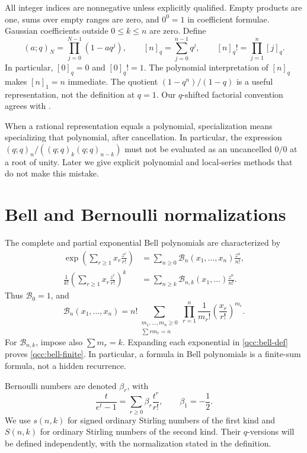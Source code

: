\documentclass[11pt,a4paper,oneside,openany]{book}
\theoremstyle{definition}
\theoremstyle{remark}
\newcommand{\qi}[2][q]{[#2]_{#1}}
\newcommand{\qf}[2][q]{[#2]_{#1}!}
\newcommand{\Y}[1]{\mathcal B_{#1}}
\newcommand{\B}[2]{\mathcal B_{#1,#2}}
\begin{document}
All integer indices are nonnegative unless explicitly qualified. Empty products
are one, sums over empty ranges are zero, and \(0^0=1\) in coefficient formulae.
Gaussian coefficients outside \(0\le k\le n\) are zero. Define
\begin{equation}\label{qcc:notation}
 (a;q)_N=\prod_{j=0}^{N-1}(1-aq^j),\qquad
 \qi n=\sum_{j=0}^{n-1}q^j,\qquad
 \qf n=\prod_{j=1}^n\qi j.
\end{equation}
In particular, \([0]_q=0\) and \([0]_q!=1\). The polynomial interpretation of
\([n]_q\) makes \([n]_1=n\) immediate. The quotient
\((1-q^n)/(1-q)\) is a useful representation, not the definition at \(q=1\).
Our \(q\)-shifted factorial convention agrees with \cite{dlmf172}.

When a rational representation equals a polynomial, specialization means
specializing that polynomial, after cancellation. In particular, the expression
\((q;q)_n/((q;q)_k(q;q)_{n-k})\) must not be evaluated as an uncancelled
\(0/0\) at a root of unity. Later we give explicit polynomial and local-series
methods that do not make this mistake.

\section{Bell and Bernoulli normalizations}
The complete and partial exponential Bell polynomials are characterized by
\begin{align}
 \exp\left(\sum_{r\ge1}x_r\frac{z^r}{r!}\right)
 &=\sum_{n\ge0}\Y n(x_1,\ldots,x_n)\frac{z^n}{n!},\label{qcc:bell-def}\\
 \frac1{k!}\left(\sum_{r\ge1}x_r\frac{z^r}{r!}\right)^k
 &=\sum_{n\ge k}\B nk(x_1,\ldots)\frac{z^n}{n!}.\label{qcc:partial-def}
\end{align}
Thus \(\Y0=1\), and
\begin{equation}\label{qcc:bell-finite}
 \Y n(x_1,\ldots,x_n)
 =n!\!\sum_{\substack{m_1,\ldots,m_n\ge0\\\sum r m_r=n}}
 \prod_{r=1}^n\frac1{m_r!}\left(\frac{x_r}{r!}\right)^{m_r}.
\end{equation}
For \(\B nk\), impose also \(\sum m_r=k\). Expanding each exponential in
\eqref{qcc:bell-def} proves \eqref{qcc:bell-finite}. In particular, a formula in
Bell polynomials is a finite-sum formula, not a hidden recurrence.

Bernoulli numbers are denoted \(\beta_r\), with
\begin{equation}\label{qcc:bernoulli-def}
 \frac{t}{e^t-1}=\sum_{r\ge0}\beta_r\frac{t^r}{r!},
 \qquad \beta_1=-\frac12.
\end{equation}
We use \(s(n,k)\) for signed ordinary Stirling numbers of the first kind and
\(S(n,k)\) for ordinary Stirling numbers of the second kind. Their \(q\)-versions
will be defined independently, with the normalization stated in the definition.
\end{document}
